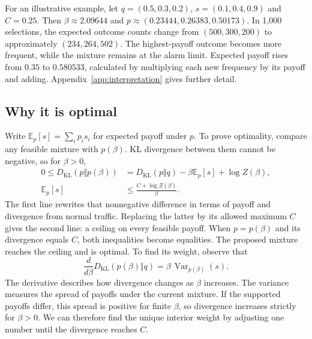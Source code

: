 \documentclass[11pt,a4paper]{article}
\newcommand{\KL}{D_{\mathrm{KL}}}
\newcommand{\E}{\mathbb{E}}
\begin{document}
For an illustrative example, let $q=(0.5,0.3,0.2)$,
$s=(0.1,0.4,0.9)$ and $C=0.25$.
Then $\beta\approx2.09644$ and
$p\approx(0.23444,0.26383,0.50173)$. In 1,000 selections, the expected
outcome counts change from $(500,300,200)$ to approximately
$(234,264,502)$. The highest-payoff outcome becomes more frequent,
while the mixture remains at the alarm limit. Expected payoff rises
from $0.35$ to $0.580533$, calculated by multiplying each new frequency
by its payoff and adding. Appendix~\ref{app:interpretation} gives
further detail.

\subsection{Why it is optimal}
Write $\E_p[s]=\sum_i p_i s_i$ for expected payoff under $p$. To prove
optimality, compare any feasible mixture with $p(\beta)$. KL divergence
between them cannot be negative, so for $\beta>0$,
\begin{align}
 0\leq\KL(p\Vert p(\beta))
 &=\KL(p\Vert q)-\beta\E_p[s]+\log Z(\beta),\\
 \E_p[s]&\leq\frac{C+\log Z(\beta)}{\beta}.
\end{align}
The first line rewrites that nonnegative difference in terms of payoff
and divergence from normal traffic. Replacing the latter by its allowed
maximum $C$ gives the second line: a ceiling on every feasible payoff.
When $p=p(\beta)$ and its divergence equals $C$, both inequalities become
equalities. The proposed mixture reaches the ceiling and is optimal.
To find its weight, observe that
\begin{equation}
 \frac{d}{d\beta}\KL(p(\beta)\Vert q)
 =\beta\,\operatorname{Var}_{p(\beta)}(s).
\end{equation}
The derivative describes how divergence changes as $\beta$ increases.
The variance measures the spread of payoffs under the current mixture.
If the supported payoffs differ, this spread is positive for finite
$\beta$, so divergence increases strictly for $\beta>0$. We can therefore
find the unique interior weight by adjusting one number until the
divergence reaches $C$.
\end{document}
